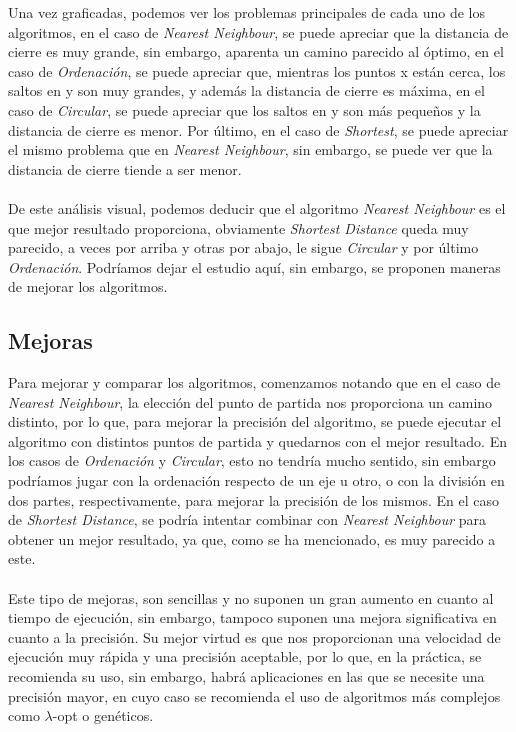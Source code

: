 \documentclass[11pt,openany]{book}
\begin{document}
Una vez graficadas, podemos ver los problemas principales de cada uno de los algoritmos,
en el caso de \textit{Nearest Neighbour}, se puede apreciar que la distancia de cierre
es muy grande, sin embargo, aparenta un camino parecido al óptimo, en el caso de 
\textit{Ordenación}, se puede apreciar que, mientras los puntos x están cerca, los saltos
en y son muy grandes, y además la distancia de cierre es máxima, en el caso de \textit{Circular},
se puede apreciar que los saltos en y son más pequeños y la distancia de cierre es menor.
Por último, en el caso de \textit{Shortest}, se puede apreciar el mismo problema que en 
\textit{Nearest Neighbour}, sin embargo, se puede ver que la distancia de cierre tiende a ser
menor.
\\ \\ 
De este análisis visual, podemos deducir que el algoritmo \textit{Nearest Neighbour} es el
que mejor resultado proporciona, obviamente \textit{Shortest Distance} queda muy parecido, a veces
por arriba y otras por abajo, le sigue \textit{Circular} y por último \textit{Ordenación}.
Podríamos dejar el estudio aquí, sin embargo, se proponen maneras de mejorar los algoritmos.
\subsection{Mejoras}
Para mejorar y comparar los algoritmos, comenzamos notando que en el caso de 
\textit{Nearest Neighbour}, la elección del punto de partida nos proporciona un camino
distinto, por lo que, para mejorar la precisión del algoritmo, se puede ejecutar
el algoritmo con distintos puntos de partida y quedarnos con el mejor resultado.
En los casos de \textit{Ordenación} y \textit{Circular}, esto no tendría mucho sentido, 
sin embargo podríamos jugar con la ordenación respecto de un eje u otro, o con la
división en dos partes, respectivamente, para mejorar la precisión de los mismos.
En el caso de \textit{Shortest Distance}, se podría intentar combinar con \textit{Nearest Neighbour}
para obtener un mejor resultado, ya que, como se ha mencionado, es muy parecido a este.
\\ \\
Este tipo de mejoras, son sencillas y no suponen un gran aumento en cuanto al tiempo
de ejecución, sin embargo, tampoco suponen una mejora significativa en cuanto a la
precisión. Su mejor virtud es que nos proporcionan una velocidad de ejecución muy
rápida y una precisión aceptable, por lo que, en la práctica, se recomienda su uso,
sin embargo, habrá aplicaciones en las que se necesite una precisión mayor, en cuyo 
caso se recomienda el uso de algoritmos más complejos como $\lambda$-opt o genéticos.
\end{document}
